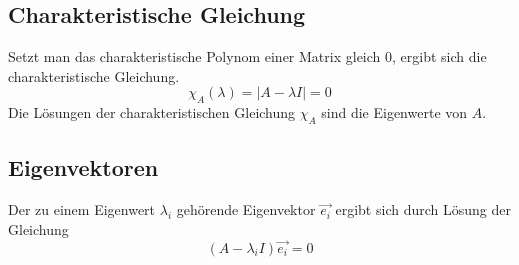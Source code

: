 \subsection{Charakteristische Gleichung}
\label{sub:charakteristische_gleichung} 

Setzt man das charakteristische Polynom einer Matrix gleich 0, ergibt sich die charakteristische Gleichung.
\begin{equation}
	\chi_A(\lambda) = |A - \lambda I| = 0
\end{equation}
Die Lösungen der charakteristischen Gleichung $\chi_A$ sind die Eigenwerte von $A$.

\subsection{Eigenvektoren}
\label{sub:eigenvektoren}

Der zu einem Eigenwert $\lambda_i$ gehörende Eigenvektor $\overrightarrow{e_i}$ ergibt sich durch Lösung der Gleichung
\begin{equation}
	(A - \lambda_i I)\overrightarrow{e_i} = 0
\end{equation}